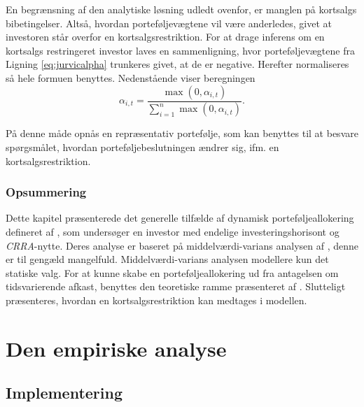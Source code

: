 \documentclass[
  a4paper,
  oneside]{memoir}
\begin{document}
En begrænsning af den analytiske løsning udledt ovenfor, er manglen på kortsalgs bibetingelser. Altså, hvordan porteføljevægtene vil være anderledes, givet at investoren står overfor en kortsalgsrestriktion. For at drage inferens om en kortsalgs restringeret investor laves en sammenligning, hvor porteføljevægtene fra Ligning \eqref{eq:jurvicalpha} trunkeres givet, at de er negative. Herefter normaliseres så hele formuen benyttes. Nedenstående viser beregningen
\begin{equation}
\alpha_{i,t}=\frac{\max(0,\alpha_{i,t})}{\sum_{i=1}^n \max(0,\alpha_{i,t})}.\label{eq:kortsalgsrestr}
\end{equation}

På denne måde opnås en repræsentativ portefølje, som kan benyttes til at besvare spørgsmålet, hvordan porteføljebeslutningen ændrer sig, ifm. en kortsalgsrestriktion.

\hypertarget{opsummering-1}{%
\section{Opsummering}\label{opsummering-1}}

Dette kapitel præsenterede det generelle tilfælde af dynamisk porteføljeallokering defineret af \citep{CampVic2003}, som undersøger en investor med endelige investeringshorisont og \emph{CRRA}-nytte. Deres analyse er baseret på middelværdi-varians analysen af \citep{Markowitz1952}, denne er til gengæld mangelfuld. Middelværdi-varians analysen modellere kun det statiske valg. For at kunne skabe en porteføljeallokering ud fra antagelsen om tidsvarierende afkast, benyttes den teoretiske ramme præsenteret af \citep{JurVic2011}. Slutteligt præsenteres, hvordan en kortsalgsrestriktion kan medtages i modellen.

\part{Den empiriske analyse}

\hypertarget{imple}{%
\chapter{Implementering}\label{imple}}
\end{document}
